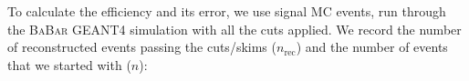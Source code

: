 
To calculate the efficiency and its error, we use signal MC events, run through the \textsc{BaBar} GEANT4 simulation with all the cuts applied. We record the number of reconstructed events passing the cuts/skims ($n_{\text{rec}}$) and the number of events that we started with ($n$):
